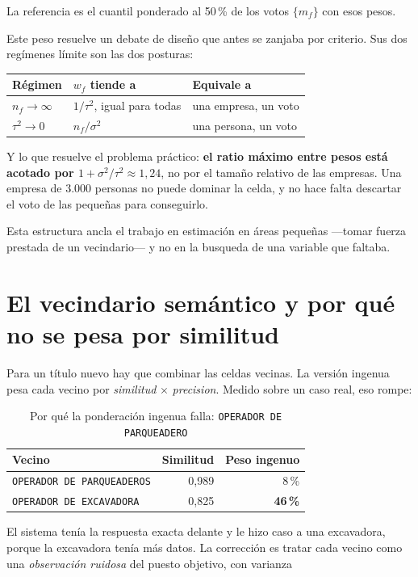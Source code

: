 \documentclass[12pt,a4paper]{report}
\newcommand{\cargo}[1]{\texttt{#1}}
\begin{document}
La referencia es el cuantil ponderado al 50\,\% de los votos $\{m_f\}$ con esos
pesos.

Este peso resuelve un debate de diseño que antes se zanjaba por criterio. Sus dos
regímenes límite son las dos posturas:

\begin{table}[h]
\centering
\begin{tabular}{lll}
\toprule
Régimen & $w_f$ tiende a & Equivale a \\
\midrule
$n_f \to \infty$ & $1/\tau^2$, igual para todas & una empresa, un voto \\
$\tau^2 \to 0$ & $n_f/\sigma^2$ & una persona, un voto \\
\bottomrule
\end{tabular}
\end{table}

Y lo que resuelve el problema práctico: \textbf{el ratio máximo entre pesos está
acotado por $1 + \sigma^2/\tau^2 \approx 1{,}24$}, no por el tamaño relativo de
las empresas. Una empresa de 3.000 personas no puede dominar la celda, y no hace
falta descartar el voto de las pequeñas para conseguirlo.

Esta estructura ancla el trabajo en estimación en áreas pequeñas ---tomar fuerza
prestada de un vecindario--- y no en la busqueda de una variable que faltaba.

\section{El vecindario semántico y por qué no se pesa por similitud}

Para un título nuevo hay que combinar las celdas vecinas. La versión ingenua pesa
cada vecino por \emph{similitud} $\times$ \emph{precision}. Medido sobre un caso
real, eso rompe:

\begin{table}[h]
\centering
\caption{Por qué la ponderación ingenua falla: \cargo{OPERADOR DE PARQUEADERO}}
\begin{tabular}{lrr}
\toprule
Vecino & Similitud & Peso ingenuo \\
\midrule
\cargo{OPERADOR DE PARQUEADEROS} & 0,989 & 8\,\% \\
\cargo{OPERADOR DE EXCAVADORA} & 0,825 & \textbf{46\,\%} \\
\bottomrule
\end{tabular}
\end{table}

El sistema tenía la respuesta exacta delante y le hizo caso a una excavadora,
porque la excavadora tenía más datos. La corrección es tratar cada vecino como
una \emph{observación ruidosa} del puesto objetivo, con varianza
\end{document}
